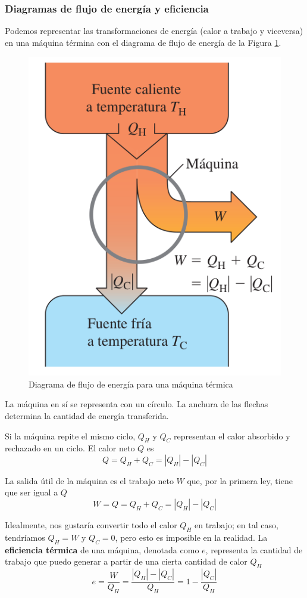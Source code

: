 \documentclass[12pt]{article}
\begin{document}
  \subsubsection{Diagramas de flujo de energía y eficiencia}
  Podemos representar las transformaciones de energía (calor a trabajo y viceversa) en una máquina términa con el diagrama de flujo de energía de la Figura \ref{fig:diag-flujo}. 

  \begin{figure}[H]
    \centering
    \includegraphics[width=0.5\linewidth]{imagenes/diagrama-de-flujo.png}
    \caption{Diagrama de flujo de energía para una máquina térmica}
    \label{fig:diag-flujo}
  \end{figure}
  
  La máquina en sí se representa con un círculo. La anchura de las flechas determina la cantidad de energía transferida.
  
  Si la máquina repite el mismo ciclo, $ Q_{H} $ y $ Q_{C} $ representan el calor absorbido y rechazado en un ciclo. El calor neto $ Q $ es 
  \[
    Q = Q_{H} + Q_{C} = \left|Q_{H}\right| - \left|Q_{C}\right|
  \]

  La salida útil de la máquina es el trabajo neto $ W $ que, por la primera ley, tiene que ser igual a $ Q $
  \[
    W = Q = Q_{H} + Q_{C} = \left|Q_{H}\right| - \left|Q_{C}\right|
  \]

  Idealmente, nos gustaría convertir todo el calor $ Q_{H} $ en trabajo; en tal caso, tendríamos $ Q_{H} = W $ y $ Q_{C} = 0 $, pero esto es imposible en la realidad. La \textbf{eficiencia térmica} de una máquina, denotada como $ e $, representa la cantidad de trabajo que puedo generar a partir de una cierta cantidad de calor $ Q_{H} $
  \[
  e = \frac{W}{Q_{H}} = \frac{\left|Q_{H}\right| - \left|Q_{C}\right|}{Q_{H}} = 1 - \frac{\left|Q_{C}\right|}{Q_{H}}
  \]
\end{document}
